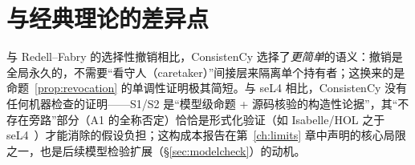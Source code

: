 \section{与经典理论的差异点}

与 Redell--Fabry 的选择性撤销相比，ConsistenCy 选择了\emph{更简单}的语义：撤销是全局永久的，不需要“看守人（caretaker）”间接层来隔离单个持有者；这换来的是命题~\ref{prop:revocation} 的单调性证明极其简短。与 seL4 相比，ConsistenCy 没有任何机器检查的证明——S1/S2 是“模型级命题 + 源码核验的构造性论据”，其“不存在旁路”部分（A1 的全称否定）恰恰是形式化验证（如 Isabelle/HOL 之于 seL4~\cite{klein2009}）才能消除的假设负担；这构成本报告在第~\ref{ch:limits} 章中声明的核心局限之一，也是后续模型检验扩展（\S\ref{sec:modelcheck}）的动机。
